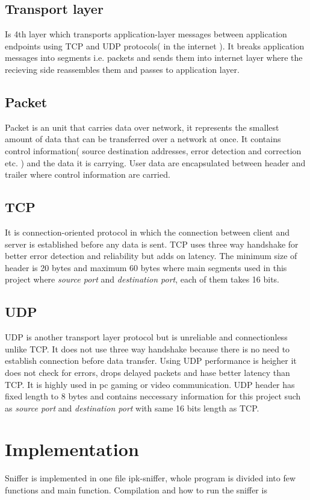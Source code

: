 \documentclass{article}
\begin{document}
\subsection*{Transport layer}
Is 4th layer which transports application-layer messages between application endpoints using TCP and UDP protocols( in the internet ). It breaks application messages into segments i.e. packets and sends them into internet layer where the recieving side reassembles them and passes to application layer.
\subsection*{Packet}
Packet is an unit that carries data over network, it represents the smallest amount of data that can be transferred over a network at once. It contains control information( source destination addresses, error detection and correction etc. ) and the data it is carrying. User data are encapsulated between header and trailer where control information are carried.
\subsection*{TCP}
It is connection-oriented protocol in which the connection between client and server is established before any data is sent. TCP uses three way handshake for better error detection and reliability but adds on latency. The minimum size of header is 20 bytes and maximum 60 bytes where main segments used in this project  where \textit{source port} and \textit{destination port}, each of them takes 16 bits.
\subsection*{UDP}
UDP is another transport layer protocol but is unreliable and connectionless unlike TCP. It does not use three way handshake because there is no need to establish connection before data transfer. Using UDP performance is heigher it does not check for errors, drops delayed packets and hase better latency than TCP. It is highly used in pc gaming or video communication. UDP header has fixed length to 8 bytes and contains neccessary information for this project such as \textit{source port} and \textit{destination port} with same 16 bits length as TCP.
\newpage


\section{Implementation}
	Sniffer is implemented in one file ipk-sniffer, whole program is divided into few 				functions and main function. Compilation and how to run the sniffer is 
\end{document}
